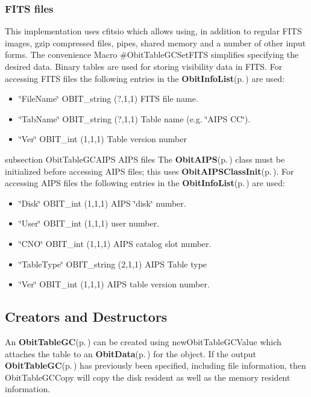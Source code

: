 \subsubsection{FITS files}\label{ObitTableWX_8h_TableFITS}
This implementation uses cfitsio which allows using, in addition to regular FITS images, gzip compressed files, pipes, shared memory and a number of other input forms. The convenience Macro \#Obit\-Table\-GCSet\-FITS simplifies specifying the desired data. Binary tables are used for storing visibility data in FITS. For accessing FITS files the following entries in the {\bf Obit\-Info\-List}{\rm (p.\,\pageref{structObitInfoList})} are used: \begin{itemize}
\item \char`\"{}File\-Name\char`\"{} OBIT\_\-string (?,1,1) FITS file name. \item \char`\"{}Tab\-Name\char`\"{} OBIT\_\-string (?,1,1) Table name (e.g. \char`\"{}AIPS CC\char`\"{}). \item \char`\"{}Ver\char`\"{} OBIT\_\-int (1,1,1) Table version number\end{itemize}
subsection Obit\-Table\-GCAIPS AIPS files The {\bf Obit\-AIPS}{\rm (p.\,\pageref{structObitAIPS})} class must be initialized before accessing AIPS files; this uses {\bf Obit\-AIPSClass\-Init}{\rm (p.\,\pageref{ObitAIPS_8c_a5})}. For accessing AIPS files the following entries in the {\bf Obit\-Info\-List}{\rm (p.\,\pageref{structObitInfoList})} are used: \begin{itemize}
\item \char`\"{}Disk\char`\"{} OBIT\_\-int (1,1,1) AIPS \char`\"{}disk\char`\"{} number. \item \char`\"{}User\char`\"{} OBIT\_\-int (1,1,1) user number. \item \char`\"{}CNO\char`\"{} OBIT\_\-int (1,1,1) AIPS catalog slot number. \item \char`\"{}Table\-Type\char`\"{} OBIT\_\-string (2,1,1) AIPS Table type \item \char`\"{}Ver\char`\"{} OBIT\_\-int (1,1,1) AIPS table version number.\end{itemize}
\subsection{Creators and Destructors}\label{ObitTableGC_8h_ObitTableGCaccess}
An {\bf Obit\-Table\-GC}{\rm (p.\,\pageref{structObitTableGC})} can be created using new\-Obit\-Table\-GCValue which attaches the table to an {\bf Obit\-Data}{\rm (p.\,\pageref{structObitData})} for the object. If the output {\bf Obit\-Table\-GC}{\rm (p.\,\pageref{structObitTableGC})} has previously been specified, including file information, then Obit\-Table\-GCCopy will copy the disk resident as well as the memory resident information.

